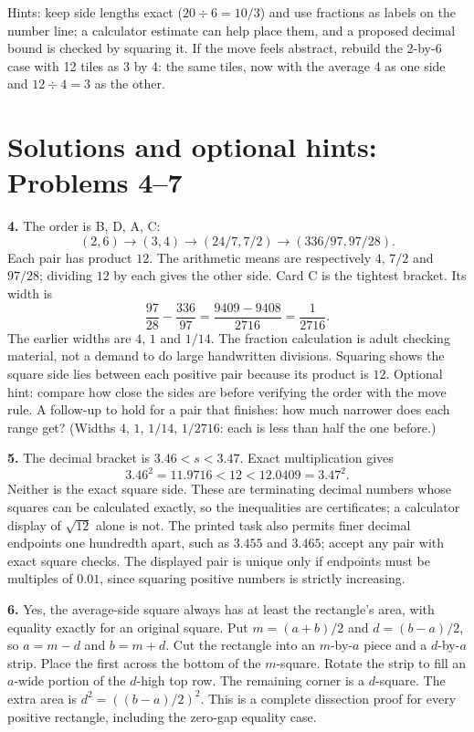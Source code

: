 \documentclass[11pt,letterpaper]{article}
\begin{document}
Hints: keep side lengths exact ($20\div6=10/3$) and use fractions as labels on the number line; a calculator estimate can help place them, and a proposed decimal bound is checked by squaring it. If the move feels abstract, rebuild the 2-by-6 case with 12 tiles as 3 by 4: the same tiles, now with the average 4 as one side and $12\div4=3$ as the other.
\newpage
\section*{Solutions and optional hints: Problems 4--7}
\textbf{4.} The order is B, D, A, C:
\[(2,6)\to(3,4)\to(24/7,7/2)\to(336/97,97/28).\]
Each pair has product $12$. The arithmetic means are respectively $4$, $7/2$ and $97/28$; dividing $12$ by each gives the other side. Card C is the tightest bracket. Its width is
\[\frac{97}{28}-\frac{336}{97}=\frac{9409-9408}{2716}=\frac1{2716}.\]
The earlier widths are $4$, $1$ and $1/14$. The fraction calculation is adult checking material, not a demand to do large handwritten divisions. Squaring shows the square side lies between each positive pair because its product is $12$. Optional hint: compare how close the sides are before verifying the order with the move rule. A follow-up to hold for a pair that finishes: how much narrower does each range get? (Widths $4$, $1$, $1/14$, $1/2716$: each is less than half the one before.)

\textbf{5.} The decimal bracket is $3.46<s<3.47$. Exact multiplication gives
\[3.46^2=11.9716<12<12.0409=3.47^2.\]
Neither is the exact square side. These are terminating decimal numbers whose squares can be calculated exactly, so the inequalities are certificates; a calculator display of $\sqrt{12}$ alone is not. The printed task also permits finer decimal endpoints one hundredth apart, such as $3.455$ and $3.465$; accept any pair with exact square checks. The displayed pair is unique only if endpoints must be multiples of $0.01$, since squaring positive numbers is strictly increasing.

\textbf{6.} Yes, the average-side square always has at least the rectangle's area, with equality exactly for an original square. Put $m=(a+b)/2$ and $d=(b-a)/2$, so $a=m-d$ and $b=m+d$. Cut the rectangle into an $m$-by-$a$ piece and a $d$-by-$a$ strip. Place the first across the bottom of the $m$-square. Rotate the strip to fill an $a$-wide portion of the $d$-high top row. The remaining corner is a $d$-square. The extra area is $d^2=((b-a)/2)^2$. This is a complete dissection proof for every positive rectangle, including the zero-gap equality case.
\end{document}
